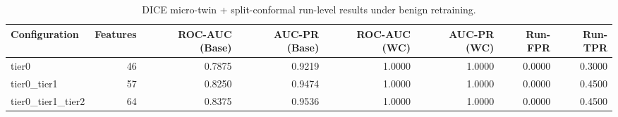 \begin{table}[t]
\centering
\caption{DICE micro-twin + split-conformal run-level results under benign retraining.}
\label{tab:dice_full_overall}
\footnotesize
\begin{tabular}{lrrrrrrr}
\toprule
Configuration & Features & ROC-AUC (Base) & AUC-PR (Base) & ROC-AUC (WC) & AUC-PR (WC) & Run-FPR & Run-TPR \\
\midrule
tier0 & 46 & 0.7875 & 0.9219 & 1.0000 & 1.0000 & 0.0000 & 0.3000 \\
tier0_tier1 & 57 & 0.8250 & 0.9474 & 1.0000 & 1.0000 & 0.0000 & 0.4500 \\
tier0_tier1_tier2 & 64 & 0.8375 & 0.9536 & 1.0000 & 1.0000 & 0.0000 & 0.4500 \\
\bottomrule
\end{tabular}

\end{table}

